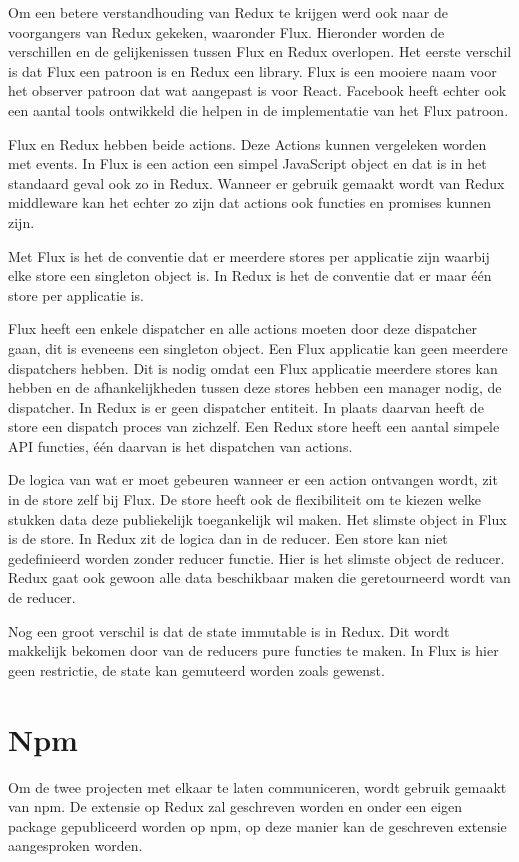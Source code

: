 Om een betere verstandhouding van Redux te krijgen werd ook naar de voorgangers van Redux gekeken, waaronder Flux. Hieronder worden de verschillen en de gelijkenissen tussen Flux en Redux overlopen. 
Het eerste verschil is dat Flux een patroon is en Redux een library. Flux is een mooiere naam voor het observer patroon dat wat aangepast is voor React. Facebook heeft echter ook een aantal tools ontwikkeld die helpen in de implementatie van het Flux patroon. 

Flux en Redux hebben beide actions. Deze Actions kunnen vergeleken worden met events. In Flux is een action een simpel JavaScript object en dat is in het standaard geval ook zo in Redux. Wanneer er gebruik gemaakt wordt van Redux middleware kan het echter zo zijn dat actions ook functies en promises kunnen zijn. 

Met Flux is het de conventie dat er meerdere stores per applicatie zijn waarbij elke store een singleton object is. In Redux is het de conventie dat er maar één store per applicatie is. 

Flux heeft een enkele dispatcher en alle actions moeten door deze dispatcher gaan, dit is eveneens een singleton object. Een Flux applicatie kan geen meerdere dispatchers hebben. Dit is nodig omdat een Flux applicatie meerdere stores kan hebben en de afhankelijkheden tussen deze stores hebben een manager nodig, de dispatcher. In Redux is er geen dispatcher entiteit. In plaats daarvan heeft de store een dispatch proces van zichzelf. Een Redux store heeft een aantal simpele API functies, één daarvan is het dispatchen van actions.

De logica van wat er moet gebeuren wanneer er een action ontvangen wordt, zit in de store zelf bij Flux. De store heeft ook de flexibiliteit om te kiezen welke stukken data deze publiekelijk toegankelijk wil maken. Het slimste object in Flux is de store. In Redux zit de logica dan in de reducer. Een store kan niet gedefinieerd worden zonder reducer functie. Hier is het slimste object de reducer. Redux gaat ook gewoon alle data beschikbaar maken die geretourneerd wordt van de reducer. 

Nog een groot verschil is dat de state immutable is in Redux. Dit wordt makkelijk bekomen door van de reducers pure functies te maken. In Flux is hier geen restrictie, de state kan gemuteerd worden zoals gewenst.
\autocite{flux}

\section{Npm}
Om de twee projecten met elkaar te laten communiceren, wordt gebruik gemaakt van npm. De extensie op Redux zal geschreven worden en onder een eigen package gepubliceerd worden op npm, op deze manier kan de geschreven extensie aangesproken worden. 

